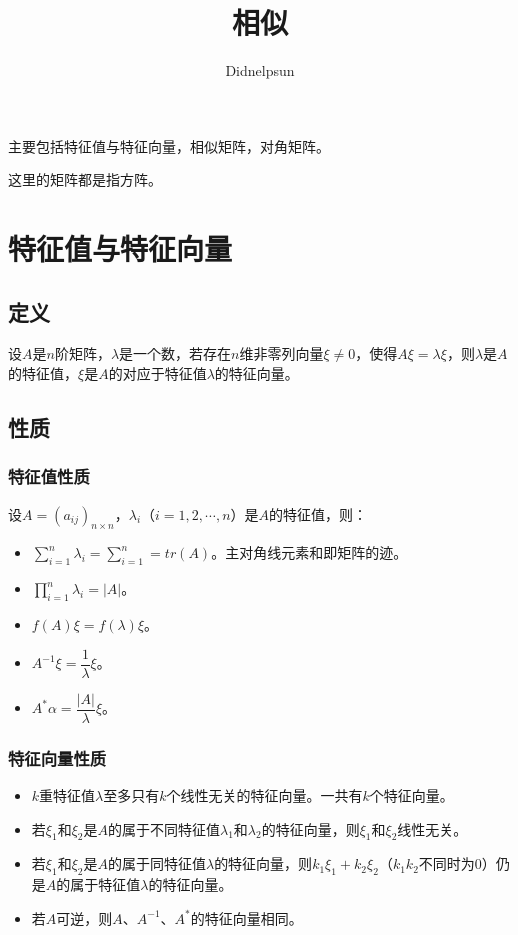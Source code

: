 \documentclass[UTF8, 12pt]{ctexart}
\author{Didnelpsun}
\title{相似}
\date{}
\begin{document}
\maketitle
\pagestyle{empty}
\thispagestyle{empty}
\tableofcontents
\thispagestyle{empty}
\newpage
\pagestyle{plain}
\setcounter{page}{1}

主要包括特征值与特征向量，相似矩阵，对角矩阵。

这里的矩阵都是指方阵。

\section{特征值与特征向量}

\subsection{定义}

设$A$是$n$阶矩阵，$\lambda$是一个数，若存在$n$维非零列向量$\xi\neq0$，使得$A\xi=\lambda\xi$，则$\lambda$是$A$的特征值，$\xi$是$A$的对应于特征值$\lambda$的特征向量。

\subsection{性质}

\subsubsection{特征值性质}

设$A=(a_{ij})_{n\times n}$，$\lambda_i$（$i=1,2,\cdots,n$）是$A$的特征值，则：

\begin{itemize}
    \item $\sum\limits_{i=1}^n\lambda_i=\sum\limits_{i=1}^n=tr(A)$。主对角线元素和即矩阵的迹。
    \item $\prod\limits_{i=1}^n\lambda_i=\vert A\vert$。
    \item $f(A)\xi=f(\lambda)\xi$。
    \item $A^{-1}\xi=\dfrac{1}{\lambda}\xi$。
    \item $A^*\alpha=\dfrac{\vert A\vert}{\lambda}\xi$。
\end{itemize}

\subsubsection{特征向量性质}

\begin{itemize}
    \item $k$重特征值$\lambda$至多只有$k$个线性无关的特征向量。一共有$k$个特征向量。
    \item 若$\xi_1$和$\xi_2$是$A$的属于不同特征值$\lambda_1$和$\lambda_2$的特征向量，则$\xi_1$和$\xi_2$线性无关。
    \item 若$\xi_1$和$\xi_2$是$A$的属于同特征值$\lambda$的特征向量，则$k_1\xi_1+k_2\xi_2$（$k_1k_2$不同时为0）仍是$A$的属于特征值$\lambda$的特征向量。
    \item 若$A$可逆，则$A$、$A^{-1}$、$A^*$的特征向量相同。
\end{itemize}
\end{document}
